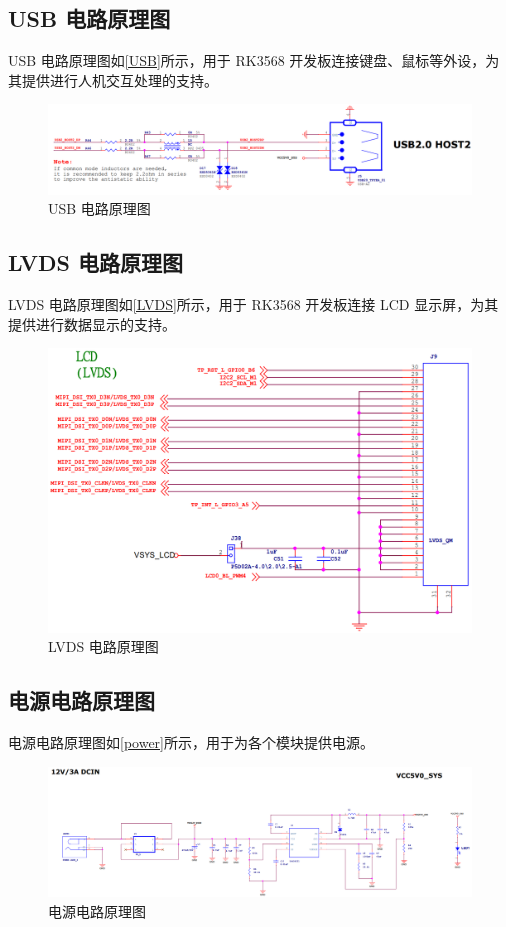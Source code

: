 \documentclass[12pt,hyperref,a4paper,UTF8]{ctexart}
\begin{document}
\subsection{USB 电路原理图}
USB 电路原理图如\autoref{USB}所示，用于 RK3568 开发板连接键盘、鼠标等外设，为其提供进行人机交互处理的支持。
\begin{figure}[htbp]
    \centering
    \includegraphics[width =.9\textwidth]{figures/USB.png}
    \caption{USB 电路原理图}
    \label{USB}
\end{figure}

\subsection{LVDS 电路原理图}
LVDS 电路原理图如\autoref{LVDS}所示，用于 RK3568 开发板连接 LCD 显示屏，为其提供进行数据显示的支持。
\begin{figure}[htbp]
    \centering
    \includegraphics[width =.8\textwidth]{figures/LCD.png}
    \caption{LVDS 电路原理图}
    \label{LVDS}
\end{figure}

\subsection{电源电路原理图}
电源电路原理图如\autoref{power}所示，用于为各个模块提供电源。
\begin{figure}[htbp]
    \centering
    \includegraphics[width =1\textwidth]{figures/power.png}
    \caption{电源电路原理图}
    \label{power}
\end{figure}
\end{document}
